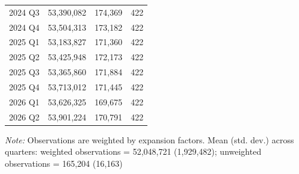 \begin{table}[H]
\begin{threeparttable}
\begin{tabular}[t]{lccc}
      2024 Q3   & 53,390,082            & 174,369                 & 422         \\
      2024 Q4   & 53,504,313            & 173,182                 & 422         \\
      2025 Q1   & 53,183,827            & 171,360                 & 422         \\
      2025 Q2   & 53,425,948            & 172,173                 & 422         \\
      2025 Q3   & 53,365,860            & 171,884                 & 422         \\
      2025 Q4   & 53,713,012            & 171,445                 & 422         \\
      2026 Q1   & 53,626,325            & 169,675                 & 422         \\
      2026 Q2   & 53,901,224            & 170,791                 & 422         \\
      \bottomrule
    \end{tabular}
    \begin{tablenotes}
      \item \textit{Note:} Observations are weighted by  expansion factors. Mean (std. dev.) across quarters: weighted observations = 52,048,721 (1,929,482); unweighted observations = 165,204 (16,163)
    \end{tablenotes}
  \end{threeparttable}
\end{table}


